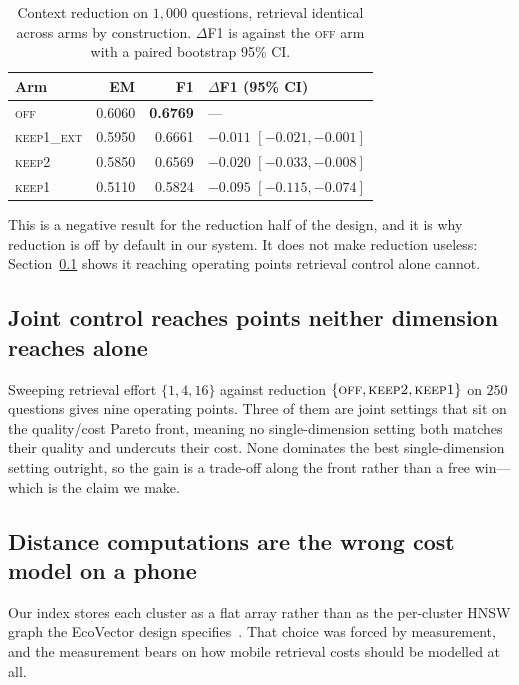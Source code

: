 \documentclass[conference]{IEEEtran}
\begin{document}
\begin{table}[t]
\caption{Context reduction on $1{,}000$ questions, retrieval identical across
arms by construction. $\Delta$F1 is against the \textsc{off} arm with a paired
bootstrap 95\% CI.}
\label{tab:scr}
\centering
\begin{tabular}{lrrl}
\toprule
Arm & EM & F1 & $\Delta$F1 (95\% CI) \\
\midrule
\textsc{off}       & 0.6060 & \textbf{0.6769} & --- \\
\textsc{keep1\_ext}& 0.5950 & 0.6661 & $-0.011$ $[-0.021, -0.001]$ \\
\textsc{keep2}     & 0.5850 & 0.6569 & $-0.020$ $[-0.033, -0.008]$ \\
\textsc{keep1}     & 0.5110 & 0.5824 & $-0.095$ $[-0.115, -0.074]$ \\
\bottomrule
\end{tabular}
\end{table}

This is a negative result for the reduction half of the design, and it is why
reduction is off by default in our system. It does not make reduction useless:
Section~\ref{sec:joint} shows it reaching operating points retrieval control
alone cannot.

\subsection{Joint control reaches points neither dimension reaches alone}
\label{sec:joint}

Sweeping retrieval effort $\{1,4,16\}$ against reduction
$\{\textsc{off},\textsc{keep2},\textsc{keep1}\}$ on $250$ questions gives nine
operating points. Three of them are joint settings that sit on the
quality/cost Pareto front, meaning no single-dimension setting both matches
their quality and undercuts their cost. None dominates the best
single-dimension setting outright, so the gain is a trade-off along the front
rather than a free win---which is the claim we make.

\subsection{Distance computations are the wrong cost model on a phone}
\label{sec:regime}

Our index stores each cluster as a flat array rather than as the per-cluster
HNSW graph the EcoVector design specifies~\cite{park2025mobilerag}. That choice
was forced by measurement, and the measurement bears on how mobile retrieval
costs should be modelled at all.
\end{document}
